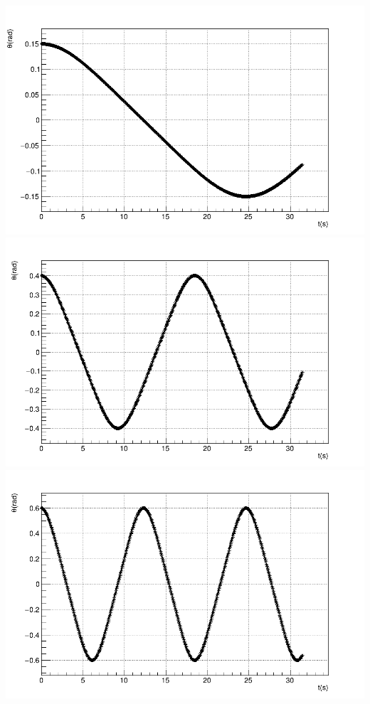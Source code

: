 \documentclass[main.tex]{subfiles}
\begin{document}
\begin{enumerate}[label=\textbf{\alph*)}]
\begin{center}
        \includegraphics[scale=0.15]{../q3/alpha3/theta0.2/plots/theta_t_ec.png}
        \includegraphics[scale=0.15]{../q3/alpha3/theta0.4/plots/theta_t_ec.png}
        \includegraphics[scale=0.15]{../q3/alpha3/theta0.6/plots/theta_t_ec.png}

\end{center}
\end{enumerate}
\end{document}

